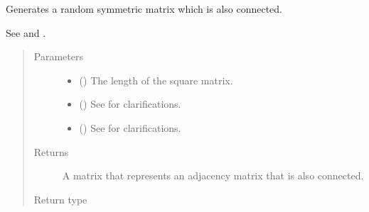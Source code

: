 \documentclass[letterpaper,10pt,english]{sphinxmanual}
\begin{document}

\begin{fulllineitems}
\label{\detokenize{app.domain.helpers:app.domain.helpers.matrices.new_symmetric_connected_matrix}}
Generates a random symmetric matrix which is also connected.

See {\hyperref[\detokenize{app.domain.helpers:app.domain.helpers.matrices.new_symmetric_matrix}]{}} and {\hyperref[\detokenize{app.domain.helpers:app.domain.helpers.matrices.make_connected}]{}}.
\begin{quote}\begin{description}
\item[{Parameters}] \leavevmode\begin{itemize}
\item {} 
 () \textendash{} The length of the square matrix.

\item {} 
 () \textendash{} See {\hyperref[\detokenize{app.domain.helpers:app.domain.helpers.matrices.new_symmetric_matrix}]{}}
for clarifications.

\item {} 
 () \textendash{} See {\hyperref[\detokenize{app.domain.helpers:app.domain.helpers.matrices.new_symmetric_matrix}]{}}
for clarifications.

\end{itemize}

\item[{Returns}] \leavevmode
A matrix that represents an adjacency matrix that is also connected.

\item[{Return type}] \leavevmode
{}

\end{description}\end{quote}

\end{fulllineitems}
\end{document}
